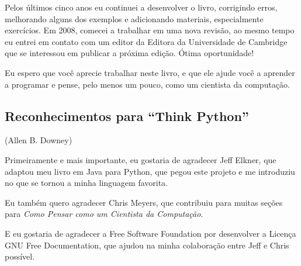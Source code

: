 Pelos últimos cinco anos eu continuei a desenvolver o livro, corrigindo erros, 
melhorando alguns dos exemplos e adicionando materiais, especialmente 
exercícios. Em 2008, comecei a trabalhar em uma nova revisão, ao mesmo 
tempo eu entrei em contato com um editor da Editora da Universidade de 
Cambridge que se interessou em publicar a próxima edição. Ótima oportunidade!


Eu espero que você aprecie trabalhar neste livro, e que ele ajude você a 
aprender a programar e pense, pelo menos um pouco, como um cientista da 
computação.

\subsection*{Reconhecimentos para ``Think Python''}

(Allen B. Downey)


Primeiramente e mais importante, eu gostaria de agradecer Jeff Elkner, 
que adaptou meu livro em Java para Python, que pegou este projeto e me 
introduziu no que se tornou a minha linguagem favorita.


Eu também quero agradecer Chris Meyers, que contribuiu para muitas seções 
para \emph{Como Pensar como um Cientista da Computação}.


E eu gostaria de agradecer a Free Software Foundation por desenvolver a 
Licença GNU Free Documentation, que ajudou na minha colaboração entre Jeff 
e Chris possível.


